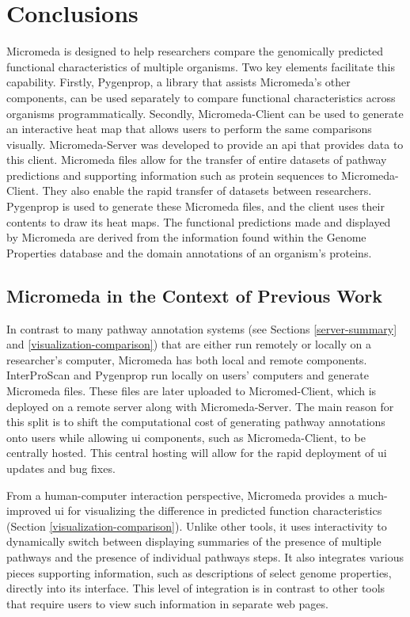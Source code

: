 \chapter{Conclusions} \label{conclusion-chapter}

Micromeda is designed to help researchers compare the genomically predicted 
functional characteristics of multiple organisms. Two key elements facilitate 
this capability. Firstly, Pygenprop, a library that assists Micromeda's other 
components, can be used separately to compare functional characteristics across 
organisms programmatically. Secondly, Micromeda-Client can be used to generate 
an interactive heat map that allows users to perform the same comparisons 
visually. Micromeda-Server was developed to provide an \gls{api} that provides 
data to this client. Micromeda files allow for the transfer of entire datasets 
of pathway predictions and supporting information such as protein sequences to 
Micromeda-Client. They also enable the rapid transfer of datasets between 
researchers. Pygenprop is used to generate these Micromeda files, and the client 
uses their contents to draw its heat maps. The functional predictions made and 
displayed by Micromeda are derived from the information found within the Genome 
Properties database and the domain annotations of an organism's proteins. 

\section{Micromeda in the Context of Previous Work}

In contrast to many pathway annotation systems (see Sections 
\ref{server-summary} and \ref{visualization-comparison}) that are either run 
remotely or locally on a researcher's computer, Micromeda has both local and 
remote components. InterProScan and Pygenprop run locally on users' computers 
and generate Micromeda files. These files are later uploaded to Micromed-Client, 
which is deployed on a remote server along with Micromeda-Server. The main 
reason for this split is to shift the computational cost of generating pathway 
annotations onto users while allowing \gls{ui} components, such as 
Micromeda-Client, to be centrally hosted. This central hosting will allow for 
the rapid deployment of \gls{ui} updates and bug fixes.

From a human-computer interaction perspective, Micromeda provides a 
much-improved \gls{ui} for visualizing the difference in predicted function 
characteristics (Section \ref{visualization-comparison}). Unlike other tools, it 
uses interactivity to dynamically switch between displaying summaries of the 
presence of multiple pathways and the presence of individual pathways steps. It 
also integrates various pieces supporting information, such as descriptions of 
select genome properties, directly into its interface. This level of integration 
is in contrast to other tools that require users to view such information in 
separate web pages.

